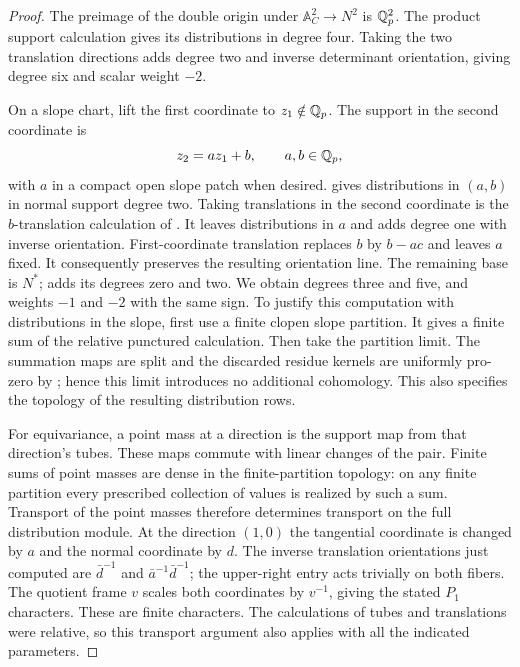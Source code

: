 \begin{proof}
The preimage of the double origin under
$\mathbb A^2_C\to N^2$ is $\mathbb Q_p^2$.
The product support calculation gives its distributions in
degree four.  Taking the two translation directions adds
degree two and inverse determinant orientation, giving
degree six and scalar weight $-2$.

On a slope chart, lift the first coordinate to
$z_1\notin\mathbb Q_p$.  The support in the second coordinate is
\[
 z_2=a z_1+b,\qquad a,b\in\mathbb Q_p,
\]
with $a$ in a compact open slope patch when desired.
 gives distributions in $(a,b)$ in
normal support degree two.  Taking translations in the
second coordinate is the $b$-translation calculation of
.  It leaves distributions in $a$
and adds degree one with inverse orientation.  First-coordinate
translation replaces $b$ by $b-ac$ and leaves $a$ fixed.
It consequently preserves the resulting orientation line.
The remaining base is $N^*$; 
adds its degrees zero and two.  We obtain degrees three and
five, and weights $-1$ and $-2$ with the same sign.
To justify this computation with distributions in the slope,
first use a finite clopen slope partition.  It gives a finite
sum of the relative punctured calculation.  Then take the
partition limit.  The summation maps are split and the
discarded residue kernels are uniformly pro-zero by
; hence this limit introduces no
additional cohomology.  This also specifies the topology
of the resulting distribution rows.

For equivariance, a point mass at a direction is the support
map from that direction's tubes.  These maps commute with
linear changes of the pair.  Finite sums of point masses
are dense in the finite-partition topology: on any finite
partition every prescribed collection of values is realized
by such a sum.  Transport of the point masses therefore
determines transport on the full distribution module.
At the direction $(1,0)$ the tangential coordinate is changed
by $a$ and the normal coordinate by $d$.  The inverse
translation orientations just computed are $\bar d^{-1}$
and $\bar a^{-1}\bar d^{-1}$; the upper-right entry acts
trivially on both fibers.  The quotient frame $v$ scales
both coordinates by $v^{-1}$, giving the stated $P_1$
characters.  These are finite characters.  The calculations
of tubes and translations were relative, so this transport
argument also applies with all the indicated parameters.
\end{proof}

